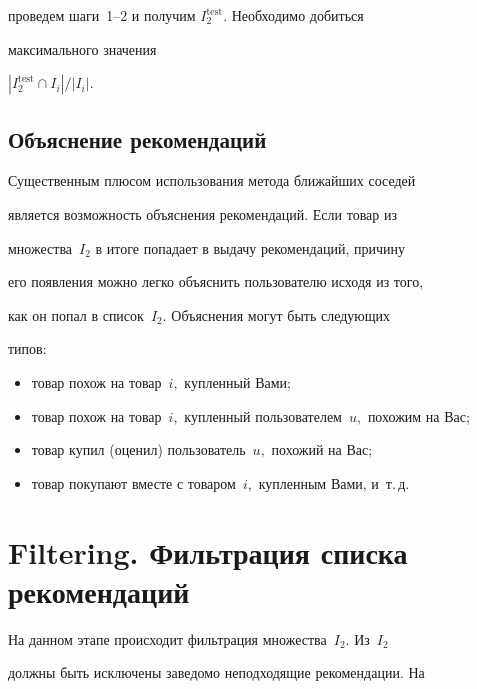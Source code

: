 проведем шаги~1--2 и получим $I_2^{\mathrm{test}}.$ Необходимо добиться


максимального значения 


$ {|I_2^{\mathrm{test}}\cap I_i| }/{|I_i|}$.





\subsection{Объяснение рекомендаций}





Существенным плюсом использования метода ближайших соседей


является возможность объяснения рекомендаций. Если товар из


множества~$I_2$ в итоге попадает в выдачу рекомендаций, причину


его появления можно легко объяснить пользователю исходя из того,


как он попал в список~$I_2$. Объяснения могут быть следующих


типов:


\begin{itemize} %


    \item товар похож на товар~$i,$ купленный Вами;


\item товар похож на товар~$i,$ купленный пользователем~$u,$ похожим на Вас; 


\item товар купил (оценил) пользователь~$u,$ похожий на Вас; 


\item товар покупают вместе с товаром~$i,$ купленным Вами, и~т.\,д.


\end{itemize}





\section{Filtering. Фильтрация списка рекомендаций}





На данном этапе происходит фильтрация множества~$I_2.$ Из~$I_2$


должны быть исключены заведомо неподходящие рекомендации. На


